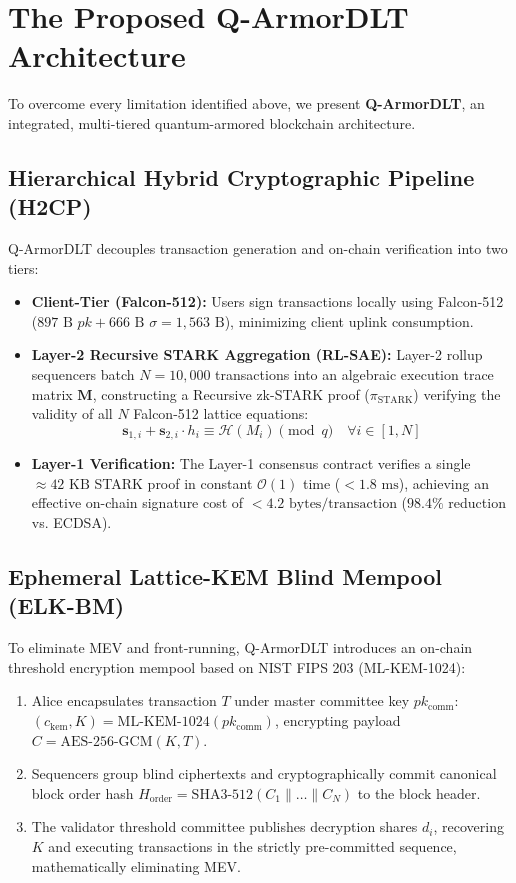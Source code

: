 \documentclass[runningheads]{llncs}
\begin{document}
\section{The Proposed Q-ArmorDLT Architecture}
To overcome every limitation identified above, we present \textbf{Q-ArmorDLT}, an integrated, multi-tiered quantum-armored blockchain architecture.

\subsection{Hierarchical Hybrid Cryptographic Pipeline (H2CP)}
Q-ArmorDLT decouples transaction generation and on-chain verification into two tiers:
\begin{itemize}
    \item \textbf{Client-Tier (Falcon-512):} Users sign transactions locally using Falcon-512 ($897\text{ B } pk + 666\text{ B } \sigma = 1,563\text{ B}$), minimizing client uplink consumption.
    \item \textbf{Layer-2 Recursive STARK Aggregation (RL-SAE):} Layer-2 rollup sequencers batch $N = 10,000$ transactions into an algebraic execution trace matrix $\mathbf{M}$, constructing a Recursive zk-STARK proof ($\pi_{\text{STARK}}$) verifying the validity of all $N$ Falcon-512 lattice equations:
    \begin{equation}
        \mathbf{s}_{1, i} + \mathbf{s}_{2, i} \cdot h_i \equiv \mathcal{H}(M_i) \pmod q \quad \forall i \in [1, N]
    \end{equation}
    \item \textbf{Layer-1 Verification:} The Layer-1 consensus contract verifies a single $\approx 42\text{ KB}$ STARK proof in constant $\mathcal{O}(1)$ time ($< 1.8\text{ ms}$), achieving an effective on-chain signature cost of $< 4.2\text{ bytes/transaction}$ ($98.4\%$ reduction vs. ECDSA).
\end{itemize}

\subsection{Ephemeral Lattice-KEM Blind Mempool (ELK-BM)}
To eliminate MEV and front-running, Q-ArmorDLT introduces an on-chain threshold encryption mempool based on NIST FIPS 203 (ML-KEM-1024):
\begin{enumerate}
    \item Alice encapsulates transaction $T$ under master committee key $pk_{\text{comm}}$: $(c_{\text{kem}}, K) = \text{ML-KEM-1024}(pk_{\text{comm}})$, encrypting payload $C = \text{AES-256-GCM}(K, T)$.
    \item Sequencers group blind ciphertexts and cryptographically commit canonical block order hash $H_{\text{order}} = \text{SHA3-512}(C_1 \parallel \dots \parallel C_N)$ to the block header.
    \item The validator threshold committee publishes decryption shares $d_i$, recovering $K$ and executing transactions in the strictly pre-committed sequence, mathematically eliminating MEV.
\end{enumerate}
\end{document}
